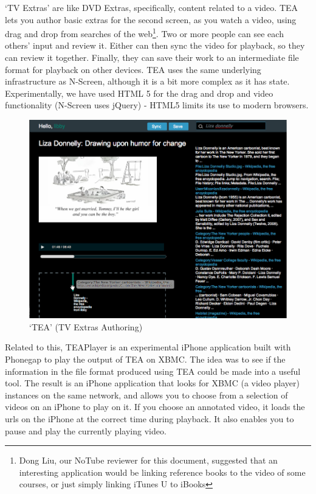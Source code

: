 \documentclass{notube}
\begin{document}
`TV Extras' are like DVD Extras, specifically, content related to a video. TEA lets you author basic extras for the second screen, as you watch a video, using drag and drop from searches of the web\footnote{Dong Liu, our NoTube reviewer for this document, suggested that an interesting application would be linking reference books to the video of some courses, or just simply linking iTunes U to iBooks}. Two or more people can see each others' input and review it. Either can then sync the video for playback, so they can review it together. Finally, they can save their work to an intermediate file format for playback on other devices. TEA uses the same underlying infrastructure as N-Screen, although it is a bit more complex as it has state. Experimentally, we have used HTML 5 for the drag and drop and video functionality (N-Screen uses jQuery) - HTML5 limits its use to modern browsers. 

\begin{figure}[htbp]
\begin{center}
\includegraphics[width=6in]{images/tea.png}
\caption{`TEA' (TV Extras Authoring)} \label{fig:tea}
\end{center}
\end{figure}

Related to this, TEAPlayer is an experimental iPhone application built with Phonegap to play the output of TEA on XBMC. The idea was to see if the information in the file format produced using TEA could be made into a useful tool. The result is an iPhone application that looks for XBMC (a video player) instances on the same network, and allows you to choose from a selection of videos on an iPhone to play on it. If you choose an annotated video, it loads the urls on the iPhone at the correct time during playback. It also enables you to pause and play the currently playing video. 
\end{document}
